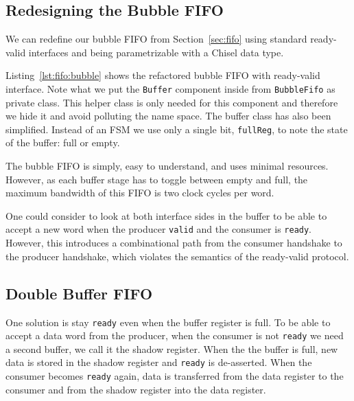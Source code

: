 \documentclass[%
    10pt,
    headinclude, footexclude,
    openright, %
    notitlepage,
    cleardoubleempty,
    headsepline,
    pointlessnumbers,
    bibtotoc, idxtotoc,
    ]{scrbook}
\newcommand{\code}[1]{{\small{\texttt{#1}}}}
\begin{document}
\subsection{Redesigning the Bubble FIFO}

We can redefine our bubble FIFO from Section~\ref{sec:fifo} using standard
ready-valid interfaces and being parametrizable with a Chisel data type.


Listing~\ref{lst:fifo:bubble} shows the refactored bubble FIFO with ready-valid
interface. Note what we put the \code{Buffer} component inside from \code{BubbleFifo}
as private class. This helper class is only needed for this component and therefore
we hide it and avoid polluting the name space. The buffer class has also been
simplified. Instead of an FSM we use only a single bit, \code{fullReg}, to note
the state of the buffer: full or empty.

The bubble FIFO is simply, easy to understand, and uses minimal resources.
However, as each buffer stage has to toggle between empty and full, the maximum
bandwidth of this FIFO is two clock cycles per word.

One could consider to look at both interface sides in the buffer to be able to accept
a new word when the producer \code{valid} and the consumer is \code{ready}.
However, this introduces a combinational path from the consumer handshake
to the producer handshake, which violates the semantics of the ready-valid protocol.

\subsection{Double Buffer FIFO}


One solution is stay \code{ready} even when the buffer register is full.
To be able to accept a data word from the producer, when the consumer is not
\code{ready} we need a second buffer, we call it the shadow register.
When the the buffer is full, new data is stored in the shadow register and \code{ready}
is de-asserted. When the consumer becomes \code{ready} again, data is transferred
from the data register to the consumer and from the shadow register into
the data register.

\end{document}

